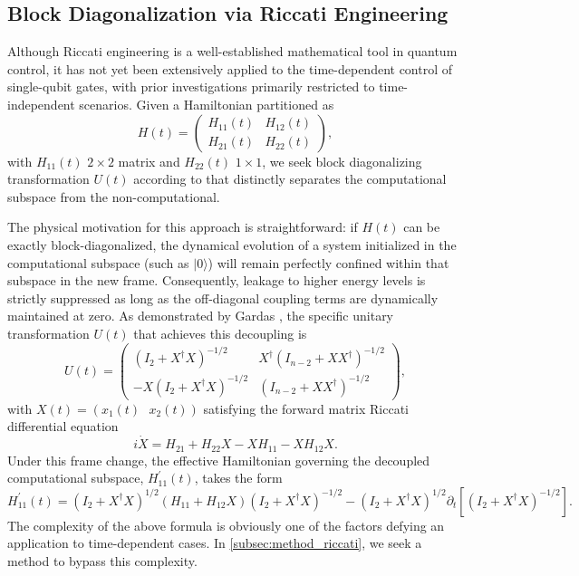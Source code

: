 \subsection{Block Diagonalization via Riccati Engineering}
Although Riccati engineering is a well-established mathematical tool in quantum control, it has not yet been extensively
applied to the time-dependent control of single-qubit gates, with prior investigations primarily restricted to
time-independent scenarios\cite{Riccati2010,Gardas2010}.
Given a Hamiltonian partitioned as
$$H(t) = \begin{pmatrix} H_{11}(t) & H_{12}(t) \\ H_{21}(t) & H_{22}(t) \end{pmatrix},$$
with $H_{11}(t)$ $2\times2$ matrix and $H_{22}(t)$ $1\times1$,
we seek block diagonalizing transformation $U(t)$ according to 
that distinctly separates the computational subspace from the non-computational.

The physical motivation for this approach is straightforward: if $H(t)$ can be exactly block-diagonalized, the dynamical
evolution of a system initialized in the computational subspace (such as $\vert{}0\rangle$) will remain perfectly
confined within that subspace in the new frame. Consequently, leakage to higher energy levels is strictly suppressed as
long as the off-diagonal coupling terms are dynamically maintained at zero. As demonstrated by Gardas \cite{Gardas2010},
the specific unitary transformation $U(t)$ that achieves this decoupling is
$$
  U(t) = \begin{pmatrix} (I_2 + X^\dagger X)^{-1/2} & X^\dagger (I_{n-2} + X X^\dagger)^{-1/2} \\ -X (I_2 + X^\dagger X)^{-1/2} & (I_{n-2} + X X^\dagger)^{-1/2} \end{pmatrix},
$$
with $X(t)=(x_1(t)\:\:\: x_2(t))$ satisfying the forward matrix Riccati differential equation
\begin{equation}
  i\dot{X} = H_{21} + H_{22}X - XH_{11} - XH_{12}X \label{eq:riccati}.
\end{equation}
Under this frame change, the effective Hamiltonian governing the decoupled computational subspace, $H_{11}^\prime(t)$,
takes the form
\begin{equation}
  H^\prime_{11}(t) = \left(I_2+X^\dagger X\right)^{1/2} (H_{11}+H_{12}X)(I_2+X^\dagger X)^{-1/2}
  - (I_2+X^\dagger X)^{1/2} \partial_t\left[(I_2+X^\dagger X)^{-1/2}\right].
  \label{eq:riccati_timeevolution}
\end{equation}
The complexity of the above formula is obviously one of the factors defying an application to time-dependent cases.
In \ref{subsec:method_riccati}, we seek a method to bypass this complexity.
